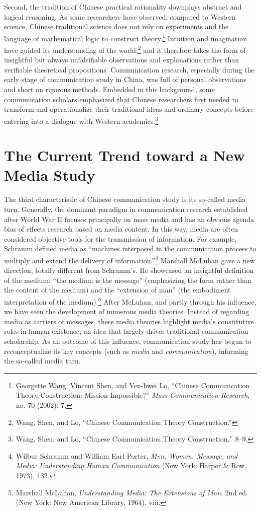 \documentclass{tufte-handout}
\begin{document}
Second, the tradition of Chinese practical rationality downplays
abstract and logical reasoning. As some researchers have observed,
compared to Western science, Chinese traditional science does not rely
on experiments and the language of mathematical logic to construct
theory.\footnote{Georgette Wang, Vincent Shen, and Ven-hwei Lo,
  ``Chinese Communication Theory Construction: Mission Impossible?''
  \emph{Mass Communication Research}, no. 70 (2002): 7.} Intuition and
imagination have guided its understanding of the world,\footnote{Wang,
  Shen, and Lo, ``Chinese Communication Theory Construction.''} and it
therefore takes the form of insightful but always unfalsifiable
observations and explanations rather than verifiable theoretical
propositions. Communication research, especially during the early stage
of communication study in China, was full of personal observations and
short on rigorous methods. Embedded in this background, some
communication scholars emphasized that Chinese researchers first needed
to transform and operationalize their traditional ideas and ordinary
concepts before entering into a dialogue with Western
academics.\footnote{Wang, Shen, and Lo, ``Chinese Communication Theory
  Construction,'' 8--9.}
  
\enlargethispage{1\baselineskip}

\hypertarget{the-current-trend-toward-a-new-media-study}{%
\section{The Current Trend toward a New Media
Study}\label{the-current-trend-toward-a-new-media-study}}

The third characteristic of Chinese communication study is its so-called
media turn. Generally, the dominant paradigm in communication research
established after World War II focuses principally on mass media and has
an obvious agenda bias of effects research based on media content. In
this way, media are often considered objective tools for the
transmission of information. For example, Schramm defined media as
``machines interposed in the communication process to multiply and
extend the delivery of information.''\footnote{Wilbur Schramm and
  William Earl Porter, \emph{Men, Women, Message, and Media:
  Understanding Human Communication} (New York: Harper \& Row, 1973),
  132.} Marshall McLuhan gave a new direction, totally different from
Schramm's. He showcased an insightful definition of the medium: ``the
medium is the message'' (emphasizing the form rather than the content of
the medium) and the ``extension of man'' (the embodiment interpretation
of the medium).\footnote{Marshall McLuhan, \emph{Understanding Media:
  The Extensions of Man}, 2nd ed. (New York: New American Library,
  1964), viii.} After McLuhan, and partly through his influence, we have
seen the development of numerous media theories. Instead of regarding
media as carriers of messages, these media theories highlight media's
constitutive roles in human existence, an idea that largely drives
traditional communication scholarship. As an outcome of this influence,
communication study has begun to reconceptualize its key concepts (such
as \emph{media} and \emph{communication}), informing the so-called media
turn.
\end{document}
